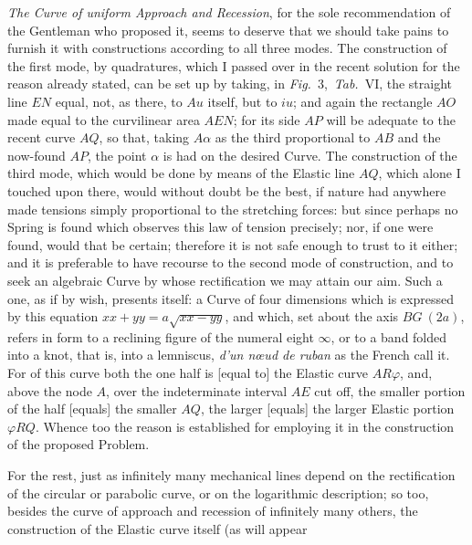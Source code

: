 \documentclass{article}
\begin{document}
\emph{The Curve of uniform Approach and Recession}, for the sole recommendation of the Gentleman who
proposed it, seems to deserve that we should take pains to furnish it with constructions according to
all three modes. The construction of the first mode, by quadratures, which I passed over in the recent
solution for the reason already stated, can be set up by taking, in \emph{Fig.}~3,\ \emph{Tab.}~VI,
the straight line $EN$ equal, not, as there, to $Au$ itself, but to $iu$; and again the rectangle
$AO$ made equal to the curvilinear area $AEN$; for its side $AP$ will be adequate to the recent curve
$AQ$, so that, taking $A\alpha$ as the third proportional to $AB$ and the now-found $AP$, the point
$\alpha$ is had on the desired Curve. The construction of the third mode, which would be done by means
of the Elastic line $AQ$, which alone I touched upon there, would without doubt be the best, if nature
had anywhere made tensions simply proportional to the stretching forces: but since perhaps no Spring
is found which observes this law of tension precisely; nor, if one were found, would that be certain;
therefore it is not safe enough to trust to it either; and it is preferable to have recourse to the
second mode of construction, and to seek an algebraic Curve by whose rectification we may attain our
aim. Such a one, as if by wish, presents itself: a Curve of four dimensions which is expressed by this
equation $xx + yy = a\sqrt{xx - yy}$, and which, set about the axis $BG\ (2a)$, refers in form to a
reclining figure of the numeral eight $\infty$, or to a band folded into a knot, that is, into a
lemniscus, \emph{d'un nœud de ruban} as the French call it. For of this curve both the one half is
[equal to] the Elastic curve $AR\varphi$, and, above the node $A$, over the indeterminate interval
$AE$ cut off, the smaller portion of the half [equals] the smaller $AQ$, the larger [equals] the
larger Elastic portion $\varphi RQ$. Whence too the reason is established for employing it in the
construction of the proposed Problem.


For the rest, just as infinitely many mechanical lines depend on the rectification of the circular or
parabolic curve, or on the logarithmic description; so too, besides the curve of approach and
recession of infinitely many others, the construction of the Elastic curve itself (as will appear
\end{document}
